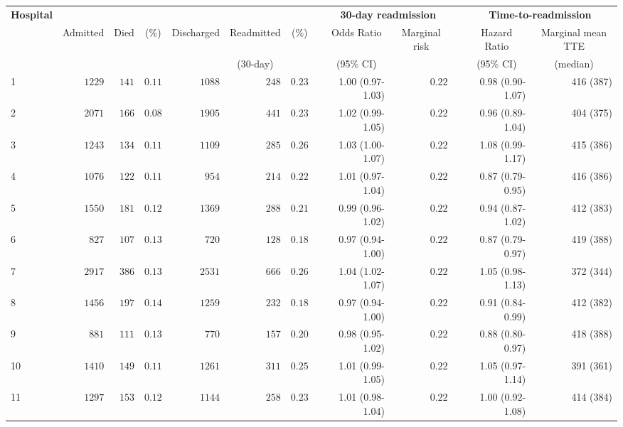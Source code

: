 \documentclass[]{article}\usepackage[]{graphicx}\usepackage[]{color}
\begin{document}
\begin{landscape}
\begin{table}[!tbp]
\end{table}
\begin{table}[!tbp]
\begin{center}
\begin{tabular}{lrrrrrrcrrcrr}
\hline\hline
\multicolumn{1}{l}{\bfseries Hospital}&\multicolumn{6}{c}{\bfseries }&\multicolumn{1}{c}{\bfseries }&\multicolumn{2}{c}{\bfseries 30-day readmission}&\multicolumn{1}{c}{\bfseries }&\multicolumn{2}{c}{\bfseries Time-to-readmission}\tabularnewline
\cline{9-10} \cline{12-13}
\multicolumn{1}{l}{}&\multicolumn{1}{c}{Admitted}&\multicolumn{1}{c}{Died}&\multicolumn{1}{c}{(\%)}&\multicolumn{1}{c}{Discharged}&\multicolumn{1}{c}{Readmitted}&\multicolumn{1}{c}{(\%)}&\multicolumn{1}{c}{}&\multicolumn{1}{c}{Odds Ratio}&\multicolumn{1}{c}{Marginal risk}&\multicolumn{1}{c}{}&\multicolumn{1}{c}{Hazard Ratio}&\multicolumn{1}{c}{Marginal mean TTE}\tabularnewline
&&&&&\multicolumn{1}{c}{{\scriptsize (30-day)}}&&&\multicolumn{1}{c}{{\scriptsize (95\% CI)}}&&&\multicolumn{1}{c}{{\scriptsize (95\% CI)}}&\multicolumn{1}{c}{{\scriptsize (median)}}\tabularnewline
\hline
1&$1229$&$141$&$0.11$&$1088$&$248$&$0.23$&&1.00 (0.97-1.03)&$0.22$&&0.98 (0.90-1.07)&416 (387)\tabularnewline
2&$2071$&$166$&$0.08$&$1905$&$441$&$0.23$&&1.02 (0.99-1.05)&$0.22$&&0.96 (0.89-1.04)&404 (375)\tabularnewline
3&$1243$&$134$&$0.11$&$1109$&$285$&$0.26$&&1.03 (1.00-1.07)&$0.22$&&1.08 (0.99-1.17)&415 (386)\tabularnewline
4&$1076$&$122$&$0.11$&$ 954$&$214$&$0.22$&&1.01 (0.97-1.04)&$0.22$&&0.87 (0.79-0.95)&416 (386)\tabularnewline
5&$1550$&$181$&$0.12$&$1369$&$288$&$0.21$&&0.99 (0.96-1.02)&$0.22$&&0.94 (0.87-1.02)&412 (383)\tabularnewline
6&$ 827$&$107$&$0.13$&$ 720$&$128$&$0.18$&&0.97 (0.94-1.00)&$0.22$&&0.87 (0.79-0.97)&419 (388)\tabularnewline
7&$2917$&$386$&$0.13$&$2531$&$666$&$0.26$&&1.04 (1.02-1.07)&$0.22$&&1.05 (0.98-1.13)&372 (344)\tabularnewline
8&$1456$&$197$&$0.14$&$1259$&$232$&$0.18$&&0.97 (0.94-1.00)&$0.22$&&0.91 (0.84-0.99)&412 (382)\tabularnewline
9&$ 881$&$111$&$0.13$&$ 770$&$157$&$0.20$&&0.98 (0.95-1.02)&$0.22$&&0.88 (0.80-0.97)&418 (388)\tabularnewline
10&$1410$&$149$&$0.11$&$1261$&$311$&$0.25$&&1.01 (0.99-1.05)&$0.22$&&1.05 (0.97-1.14)&391 (361)\tabularnewline
11&$1297$&$153$&$0.12$&$1144$&$258$&$0.23$&&1.01 (0.98-1.04)&$0.22$&&1.00 (0.92-1.08)&414 (384)\tabularnewline

\end{tabular}
\end{center}
\end{table}
\end{landscape}
\end{document}
